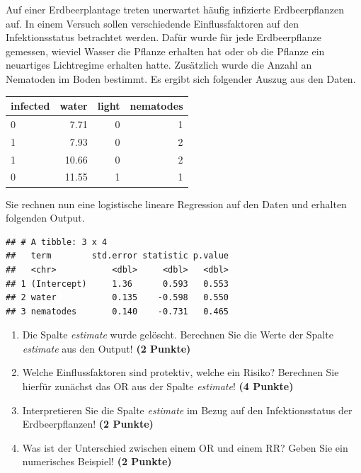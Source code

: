 \documentclass[a4paper, 10pt]{scrartcl}\usepackage[]{graphicx}\usepackage[]{xcolor}
\makeatletter
\newenvironment{kframe}{%
 \def\at@end@of@kframe{}%
 \ifinner\ifhmode%
  \def\at@end@of@kframe{\end{minipage}}%
  \begin{minipage}{\columnwidth}%
 \fi\fi%
 \def\FrameCommand##1{\hskip\@totalleftmargin \hskip-\fboxsep
 \colorbox{shadecolor}{##1}\hskip-\fboxsep
     \hskip-\linewidth \hskip-\@totalleftmargin \hskip\columnwidth}%
 \MakeFramed {\advance\hsize-\width
   \@totalleftmargin\z@ \linewidth\hsize
   \@setminipage}}%
 {\par\unskip\endMakeFramed%
 \at@end@of@kframe}
\newenvironment{knitrout}{}{} %
\makeatother
\begin{document}
Auf einer Erdbeerplantage treten unerwartet h{\"a}ufig infizierte
Erdbeerpflanzen auf. In einem Versuch sollen verschiedende Einflussfaktoren
auf den Infektionsstatus betrachtet werden. Daf{\"u}r wurde f{\"u}r jede
Erdbeerpflanze gemessen, wieviel Wasser die Pflanze erhalten hat oder ob
die Pflanze ein neuartiges Lichtregime erhalten hatte. Zus{\"a}tzlich wurde die
Anzahl an Nematoden im Boden bestimmt. Es ergibt sich folgender Auszug aus
den Daten.

\begin{knitrout}
\color{fgcolor}\begin{table}[!h]
\centering
\begin{tabular}{lrrr}
\toprule
infected & water & light & nematodes\\
\midrule
0 & 7.71 & 0 & 1\\
1 & 7.93 & 0 & 2\\
1 & 10.66 & 0 & 2\\
0 & 11.55 & 1 & 1\\
\bottomrule
\end{tabular}
\end{table}

\end{knitrout}

Sie rechnen nun eine logistische lineare Regression auf den Daten und erhalten
folgenden \Rlogo Output.

\begin{knitrout}
\color{fgcolor}\begin{kframe}
\begin{verbatim}
## # A tibble: 3 x 4
##   term        std.error statistic p.value
##   <chr>           <dbl>     <dbl>   <dbl>
## 1 (Intercept)     1.36      0.593   0.553
## 2 water           0.135    -0.598   0.550
## 3 nematodes       0.140    -0.731   0.465
\end{verbatim}
\end{kframe}
\end{knitrout}


\begin{enumerate}
\item Die Spalte \textit{estimate} wurde gel{\"o}scht. Berechnen Sie die Werte
  der Spalte \textit{estimate} aus den \Rlogo Output! \textbf{(2 Punkte)}
\item Welche Einflussfaktoren sind protektiv, welche ein Risiko? Berechnen
  Sie hierf{\"u}r zun{\"a}chst das OR aus der Spalte \textit{estimate}! \textbf{(4 Punkte)}
\item Interpretieren Sie die Spalte \textit{estimate} im Bezug auf den
  Infektionsstatus der Erdbeerpflanzen! \textbf{(2 Punkte)}
\item Was ist der Unterschied zwischen einem OR und einem RR? Geben Sie ein
  numerisches Beispiel! \textbf{(2 Punkte)}
\end{enumerate}
 
\end{document}
